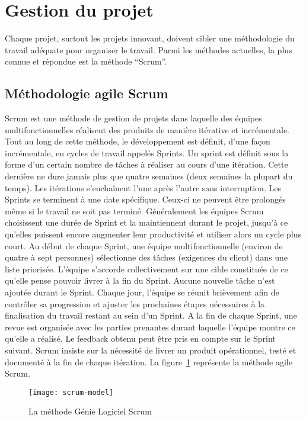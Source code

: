 \section{Gestion du projet }

Chaque projet, surtout les projets innovant, doivent cibler une méthodologie du
travail adéquate pour organiser le travail. Parmi les méthodes actuelles, la
plus connue et répondue est la méthode ``Scrum''.

\subsection{Méthodologie agile Scrum}

Scrum est une méthode de gestion de projets dans laquelle des équipes
multifonctionnelles réalisent des produits de manière itérative et
incrémentale. Tout au long de cette méthode, le développement est définit,
d'une façon incrémentale, en cycles de travail appelés Sprints. Un sprint est
définit sous la forme d'un certain nombre de tâches à réaliser au cours d'une
itération. Cette dernière ne dure jamais plus que quatre semaines (deux
semaines la plupart du temps). Les itérations s'enchaînent l'une après l'autre
sans interruption. Les Sprints se terminent à une date spécifique. Ceux-ci ne
peuvent être prolongés même si le travail ne soit pas terminé. Généralement les
équipes Scrum choisissent une durée de Sprint et la maintiennent durant le
projet, jusqu'à ce qu'elles puissent encore augmenter leur productivité et
utiliser alors un cycle plus court. Au début de chaque Sprint, une équipe
multifonctionnelle (environ de quatre à sept personnes) sélectionne des tâches
(exigences du client) dans une liste priorisée. L'équipe s'accorde
collectivement sur une cible constituée de ce qu'elle pense pouvoir livrer à la
fin du Sprint. Aucune nouvelle tâche n'est ajoutée durant le Sprint. Chaque
jour, l'équipe se réunit brièvement afin de contrôler sa progression et ajuster
les prochaines étapes nécessaires à la finalisation du travail restant au sein
d'un Sprint. A la fin de chaque Sprint, une revue est organisée avec les
parties prenantes durant laquelle l'équipe montre ce qu'elle a réalisé. Le
feedback obtenu peut être pris en compte sur le Sprint suivant. Scrum insiste
sur la nécessité de livrer un produit opérationnel, testé et documenté à la fin
de chaque itération. La figure~\ref{fig:scrum-model} représente la méthode
agile Scrum.

\begin{figure}[H]
    \centering
    \texttt{[image: scrum-model]}
    \caption{La méthode Génie Logiciel Scrum}
\label{fig:scrum-model}
\end{figure}

